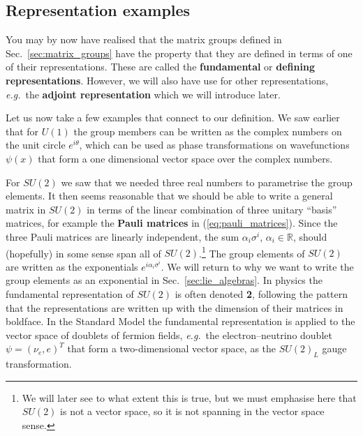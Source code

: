 \documentclass[notes.tex]{subfiles}
\begin{document}
\subsection{Representation examples}
You may by now have realised that the matrix groups defined in Sec.~\ref{sec:matrix_groups} have the property that they are defined in terms of one of their representations. These are called the {\bf fundamental} or {\bf defining  representations}. However, we will also have use for other representations, {\it e.g.}\ the {\bf adjoint representation} which we will introduce later.

Let us now take a few examples that connect to our definition. We saw earlier that for $U(1)$ the group members can be written as the complex numbers on the unit circle $e^{i \theta}$, which can be used as phase transformations on wavefunctions $\psi(x)$ that form a one dimensional vector space over the complex numbers. 

For $SU(2)$ we saw that we needed three real numbers to parametrise the group elements. It then seems reasonable that we should be able to write a general matrix in $SU(2)$ in terms of the linear combination of three unitary ``basis'' matrices, for example the {\bf Pauli matrices} in (\ref{eq:pauli_matrices}). Since the three Pauli matrices are linearly independent, the sum $\alpha_i\sigma^i$, $\alpha_i\in\mathbb R$, should (hopefully) in some sense span all of $SU(2)$.\footnote{We will later see to what extent this is true, but we must emphasise here that $SU(2)$ is not a vector space, so it is not spanning in the vector space sense.} The group elements of $SU(2)$ are written as the exponentials  $e^{i \alpha_i \sigma^i}$. We will return to why we want to write the group elements as an exponential in Sec.~\ref{sec:lie_algebras}. In physics the fundamental representation of $SU(2)$ is often denoted {\bf 2}, following the pattern that the representations are written up with the dimension of their matrices in boldface. In the Standard Model the fundamental representation is applied to the vector space of doublets of fermion fields, {\it e.g.}\ the electron--neutrino doublet $\psi = (\nu_e, e)^T$ that form a two-dimensional vector space, as the $SU(2)_L$ gauge transformation. 
\end{document}
